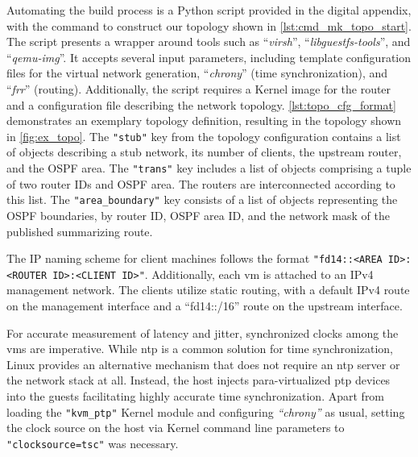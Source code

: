Automating the build process is a Python script provided in the digital
    appendix, with the command to construct our topology shown in
    \autoref{lst:cmd_mk_topo_start}.
The script presents a wrapper around tools such as ``\textit{virsh}'',
    ``\textit{libguestfs-tools}'', and ``\textit{qemu-img}''.
It accepts several input parameters, including template configuration files
    for the virtual network generation, ``\textit{chrony}'' (time
    synchronization), and ``\textit{frr}'' (routing).
Additionally, the script requires a Kernel image for the router and a
    configuration file describing the network topology.
\autoref{lst:topo_cfg_format} demonstrates an exemplary topology definition,
    resulting in the topology shown in \autoref{fig:ex_topo}.
The  \texttt{"stub"} key from the topology configuration contains a list of
    objects describing a stub network, its number of clients, the upstream
    router, and the OSPF area.
The \texttt{"trans"} key includes a list of objects comprising a tuple of two
    router IDs and OSPF area.
The routers are interconnected according to this list.
The \texttt{"area\_boundary"} key consists of a list of objects representing
    the OSPF boundaries, by router ID, OSPF area ID, and the network mask
    of the published summarizing route.

The IP naming scheme for client machines follows the format
    \texttt{"fd14::<AREA ID>:<ROUTER ID>:<CLIENT ID>"}.
Additionally, each \gls{vm} is attached to an IPv4 management network.
The clients utilize static routing, with a default IPv4 route on the management
    interface and a ``fd14::/16'' route on the upstream interface.

For accurate measurement of latency and jitter, synchronized clocks among the
    \glspl{vm} are imperative.
While \gls{ntp} is a common solution for time synchronization, Linux provides
    an alternative mechanism that does not require an \gls{ntp} server or the 
    network stack at all.
Instead, the host injects para-virtualized \gls{ptp} devices into the guests
    facilitating highly accurate time synchronization.
Apart from loading the \texttt{"kvm\_ptp"} Kernel module and configuring
    \textit{``chrony''} as usual, setting the clock source on the host via
    Kernel command line parameters to \texttt{"clocksource=tsc"} was necessary.

